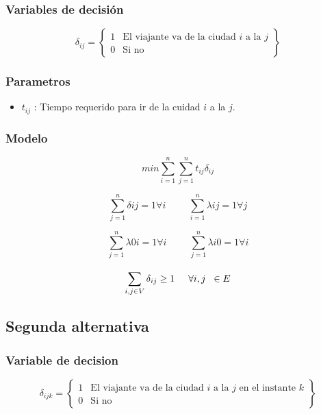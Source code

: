 \documentclass[]{article}
\begin{document}
\subsubsection{Variables de decisi\'on}

\begin{equation*}
\delta_{ij} = 
\left\{ \begin{array}{cl}
1 & \mbox{El viajante va de la ciudad $i$ a la $j$}\\
0 & \mbox{Si no}
\end{array} \right\}
\end{equation*}



\subsubsection{Parametros}

\begin{itemize}
	\item $t_{ij}$ : Tiempo requerido para ir de la cuidad $i$ a la $j$. 
\end{itemize}

\subsubsection{Modelo}

$$min \sum_{i=1}^{n} \sum_{j=1}^{n} t_{ij} \delta_{ij}$$

$$\sum_{j=1}^{n} \delta{ij} =  1 \forall i  \hspace{1cm}  \sum_{i=1}^{n} \lambda{ij} =  1 \forall j$$


$$\sum_{j=1}^{n} \lambda{0i} =  1 \forall i   \hspace{1cm}  \sum_{j=1}^{n} \lambda{i0} =  1 \forall i$$

$$\sum_{i,j \in V}^{} \delta_{ij} \geq 1  \hspace*{0.5cm} \forall i,j \hspace*{0.2cm} \in E$$


\subsection{Segunda alternativa} 

\subsubsection{Variable de decision} 

\begin{equation*}
\delta_{ijk} = 
\left\{ \begin{array}{cl}
1 & \mbox{El viajante va de la ciudad $i$ a la $j$ en el instante $k$}\\
0 & \mbox{Si no}
\end{array} \right\}
\end{equation*}
\end{document}

